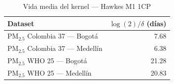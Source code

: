 \begin{table}[htbp]
\centering
\caption{Vida media del kernel --- Hawkes M1 1CP}
\label{tab:hawkes_halflife_1cp}
\begin{tabular}{lr}
\toprule
Dataset & $\log(2)/\delta$ (d\'{i}as) \\
\midrule
PM$_{2.5}$ Colombia 37 --- Bogot\'{a} & 7.68 \\
PM$_{2.5}$ Colombia 37 --- Medell\'{i}n & 6.38 \\
PM$_{2.5}$ WHO 25 --- Bogot\'{a} & 21.28 \\
PM$_{2.5}$ WHO 25 --- Medell\'{i}n & 20.83 \\
\bottomrule
\end{tabular}
\end{table}
